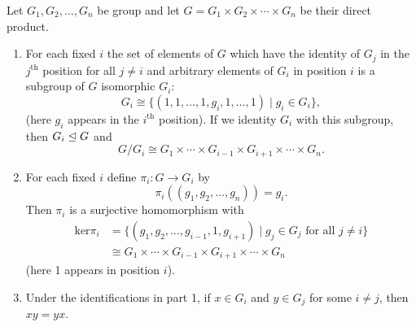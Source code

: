 \documentclass[../main]{subfiles}
\begin{document}
\begin{prop}
 Let $G_1, G_2, \ldots , G_n$ be group and let $G = G_1 \times G_2 \times \cdots \times G_n$ be their direct product.
 \begin{enumerate}
  \item For each fixed $i$ the set of elements of $G$ which have the identity of $G_j$ in the $j^{\text{th}}$ position for all $j \neq i$ and arbitrary elements of $G_i$ in position $i$ is a subgroup of $G$ isomorphic $G_i$:
  \[G_i \cong \{(1,1,\ldots, 1, g_i,1,\ldots, 1) \mid g_i\in G_i\},\]
  (here $g_i$ appears in the $i^{\text{th}}$ position). If we identity $G_i$ with this subgroup, then $G_i \trianglelefteq G$ and 
  \[G/G_i \cong G_1\times \cdots \times G_{i-1} \times G_{i+1} \times \cdots \times G_n.\]
  \item For each fixed $i$ define $\pi_i \colon G \to G_i$ by 
  \[\pi_i((g_1,g_2,\ldots,g_n)) = g_i.\]
  Then $\pi_i$ is a surjective homomorphism with
  \begin{align*}
   \text{ker}\pi_i &= \{(g_1,g_2, \ldots , g_{i-1}, 1, g_{i+1}) \mid g_j \in G_j \text{ for all } j\neq i\} \\
   &\cong G_1\times \cdots \times G_{i-1} \times G_{i+1} \times \cdots \times G_n
  \end{align*}
  (here 1 appears in position $i$).
  \item Under the identifications in part 1, if $x \in G_i$ and $y\in G_j$ for some $i \neq j$, then $xy = yx$. 
 \end{enumerate}
\end{prop}
 
 
 
 
 
 
 
 
 
 
 
 
 
 
 
 
 
 
 
 
 
 
 
 
 
 
 
 
 
 
 
 
 
 
 
 
 
 
 
 
 
 
 
 
 
\end{document}
